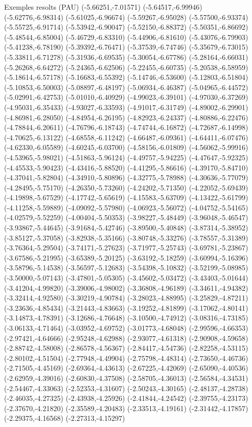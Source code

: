 \documentclass[11pt,a4paper]{article}
\begin{document}
\begin{fmex}{Exemples resolts (PAU)}
(-5.66251,-7.01571) (-5.64517,-6.99946) (-5.62776,-6.98314) (-5.61025,-6.96674) (-5.59267,-6.95028) (-5.57500,-6.93374) (-5.55725,-6.91714) (-5.53942,-6.90047) (-5.52150,-6.88372) (-5.50351,-6.86692) (-5.48544,-6.85004) (-5.46729,-6.83310) (-5.44906,-6.81610) (-5.43076,-6.79903) (-5.41238,-6.78190) (-5.39392,-6.76471) (-5.37539,-6.74746) (-5.35679,-6.73015) (-5.33811,-6.71278) (-5.31936,-6.69535) (-5.30054,-6.67786) (-5.28164,-6.66031) (-5.26268,-6.64272) (-5.24365,-6.62506) (-5.22455,-6.60735) (-5.20538,-6.58959) (-5.18614,-6.57178) (-5.16683,-6.55392) (-5.14746,-6.53600) (-5.12803,-6.51804) (-5.10853,-6.50003) (-5.08897,-6.48197) (-5.06934,-6.46387) (-5.04965,-6.44572) (-5.02991,-6.42753) (-5.01010,-6.40929) (-4.99023,-6.39101) (-4.97030,-6.37269) (-4.95031,-6.35433) (-4.93027,-6.33593) (-4.91017,-6.31749) (-4.89002,-6.29901) (-4.86981,-6.28050) (-4.84954,-6.26195) (-4.82923,-6.24337) (-4.80886,-6.22476) (-4.78844,-6.20611) (-4.76796,-6.18743) (-4.74744,-6.16872) (-4.72687,-6.14998) (-4.70625,-6.13122) (-4.68558,-6.11242) (-4.66487,-6.09361) (-4.64411,-6.07476) (-4.62330,-6.05589) (-4.60245,-6.03700) (-4.58156,-6.01809) (-4.56062,-5.99916) (-4.53965,-5.98021) (-4.51863,-5.96124) (-4.49757,-5.94225) (-4.47647,-5.92325) (-4.45533,-5.90423) (-4.43416,-5.88520) (-4.41295,-5.86616) (-4.39170,-5.84710) (-4.37041,-5.82804) (-4.34910,-5.80896) (-4.32775,-5.78988) (-4.30636,-5.77079) (-4.28495,-5.75170) (-4.26350,-5.73260) (-4.24202,-5.71350) (-4.22052,-5.69439) (-4.19898,-5.67529) (-4.17742,-5.65619) (-4.15583,-5.63709) (-4.13422,-5.61799) (-4.11258,-5.59889) (-4.09092,-5.57980) (-4.06923,-5.56072) (-4.04752,-5.54165) (-4.02579,-5.52259) (-4.00404,-5.50353) (-3.98227,-5.48449) (-3.96048,-5.46547) (-3.93867,-5.44645) (-3.91684,-5.42746) (-3.89500,-5.40848) (-3.87314,-5.38952) (-3.85127,-5.37058) (-3.82938,-5.35166) (-3.80748,-5.33276) (-3.78557,-5.31389) (-3.76364,-5.29504) (-3.74171,-5.27623) (-3.71977,-5.25743) (-3.69781,-5.23867) (-3.67586,-5.21995) (-3.65389,-5.20125) (-3.63192,-5.18259) (-3.60994,-5.16396) (-3.58796,-5.14538) (-3.56597,-5.12683) (-3.54398,-5.10832) (-3.52199,-5.08985) (-3.50000,-5.07143) (-3.47801,-5.05305) (-3.45602,-5.03472) (-3.43403,-5.01644) (-3.41204,-4.99820) (-3.39006,-4.98002) (-3.36808,-4.96189) (-3.34611,-4.94382) (-3.32414,-4.92580) (-3.30219,-4.90784) (-3.28023,-4.88995) (-3.25829,-4.87211) (-3.23636,-4.85434) (-3.21443,-4.83663) (-3.19252,-4.81899) (-3.17062,-4.80141) (-3.14873,-4.78391) (-3.12686,-4.76648) (-3.10500,-4.74912) (-3.08316,-4.73185) (-3.06133,-4.71464) (-3.03952,-4.69752) (-3.01773,-4.68048) (-2.99596,-4.66353) (-2.97421,-4.64666) (-2.95248,-4.62988) (-2.93077,-4.61318) (-2.90908,-4.59658) (-2.88742,-4.58008) (-2.86578,-4.56367) (-2.84417,-4.54736) (-2.82258,-4.53115) (-2.80102,-4.51504) (-2.77948,-4.49904) (-2.75798,-4.48314) (-2.73650,-4.46736) (-2.71505,-4.45169) (-2.69364,-4.43613) (-2.67225,-4.42069) (-2.65090,-4.40536) (-2.62959,-4.39016) (-2.60830,-4.37508) (-2.58705,-4.36013) (-2.56584,-4.34531) (-2.54467,-4.33063) (-2.52353,-4.31607) (-2.50243,-4.30165) (-2.48137,-4.28738) (-2.46035,-4.27325) (-2.43938,-4.25926) (-2.41844,-4.24542) (-2.39755,-4.23173) (-2.37670,-4.21820) (-2.35589,-4.20483) (-2.33513,-4.19161) (-2.31442,-4.17857) (-2.29375,-4.16568) (-2.27313,-4.15297) 
\end{fmex}
\end{document}
